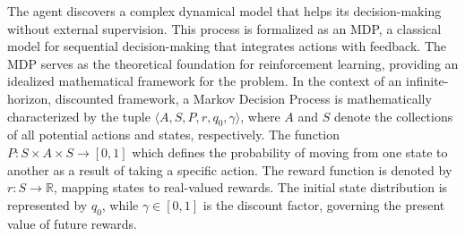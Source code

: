 \documentclass[conference]{IEEEtran}
\begin{document}
The agent discovers a complex dynamical model that helps its decision-making without external supervision. This process is formalized as an MDP, a classical model for sequential decision-making that integrates actions with feedback. The MDP serves as the theoretical foundation for reinforcement learning, providing an idealized mathematical framework for the problem.
In the context of an infinite-horizon, discounted framework, a Markov Decision Process is mathematically characterized by the tuple \( \langle A, S, P, r, q_0, \gamma \rangle \), where \( A \) and \( S \) denote the collections of all potential actions and states, respectively. The function \( P: S \times A \times S \to [0, 1] \)
which defines the probability of moving from one state to another as a result of taking a specific action. The reward function is denoted by \( r: S \to \mathbb{R} \), mapping states to real-valued rewards.
The initial state distribution is represented by \( q_0 \), while \( \gamma \in [0, 1] \) is the discount factor, governing the present value of future rewards.



\end{document}
